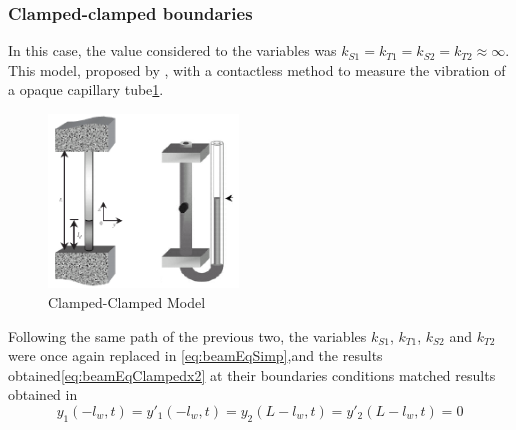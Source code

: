     \subsubsection{Clamped-clamped boundaries}
    In this case, the value considered to the variables was $k_{S1}=k_{T1}=k_{S2}=k_{T2}\approx\infty$. This model, proposed by \citeauthor{jacobsContactlessLiquidDetection2005}, with a contactless method to measure the vibration of a opaque capillary tube\ref{fig:clampedclampedmodel}.
    \begin{figure}[!htb]
        \centering
        \includegraphics[width=0.45\textwidth]{Chapters/2CHP/Diagrams/clampedclampedmodel1.pdf}
        \caption{Clamped-Clamped Model\cite{jacobsContactlessLiquidDetection2005}}
        \label{fig:clampedclampedmodel}
    \end{figure}
    Following the same path of the previous two, the variables $k_{S1}$, $k_{T1}$, $k_{S2}$ and $k_{T2}$ were once again replaced in \ref{eq:beamEqSimp},and the results obtained\ref{eq:beamEqClampedx2} at their boundaries conditions matched results obtained in \cite{jacobsContactlessLiquidDetection2005}
    \begin{equation} \label{eq:beamEqClampedx2}
        y_1(-l_w,t) = y'_1(-l_w,t) = y_2(L-l_w,t) = y'_2(L-l_w,t)=0
    \end{equation}


